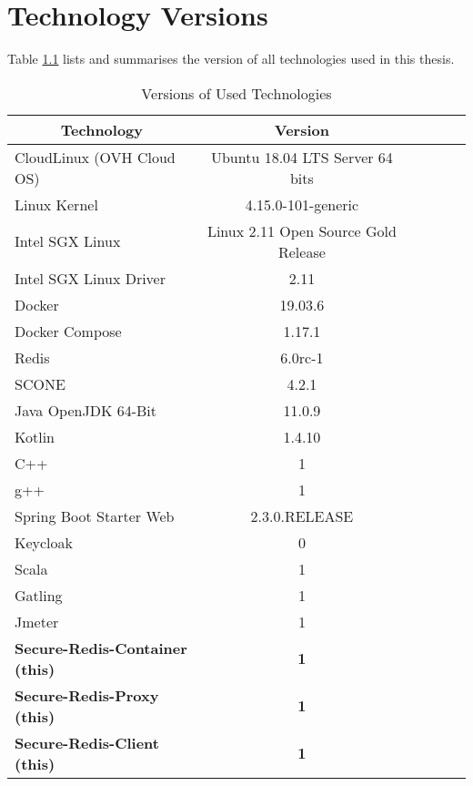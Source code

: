 \chapter{Technology Versions}
\label{ann:technology_versions}

Table \ref{tab:versions_of_used_technologies} lists and summarises the version of all technologies used in this thesis.

\begin{table}[ht]
	\caption{Versions of Used Technologies}
	\label{tab:versions_of_used_technologies}
\centering
\begin{tabular}{lccccc}
	\toprule
	\multicolumn{1}{c}{\textbf{Technology}} 	& \multicolumn{1}{c}{\textbf{Version}} \\
	\midrule
		CloudLinux (OVH Cloud OS) 			& 		Ubuntu 18.04 LTS Server 64 bits 	\\
		Linux Kernel						&		4.15.0-101-generic					\\
		Intel SGX Linux						&		Linux 2.11 Open Source Gold Release \\
		Intel SGX Linux	Driver				&		2.11								\\
		Docker								& 		19.03.6 								\\
		Docker Compose						& 		1.17.1 								\\
		Redis								& 		6.0rc-1 								\\
		SCONE 								& 		4.2.1 								\\
		Java OpenJDK 64-Bit 					& 		11.0.9								\\
		Kotlin 								& 		1.4.10								\\
		C++									& 		1									\\
		g++									& 		1									\\
		Spring Boot Starter	Web				& 		2.3.0.RELEASE						\\
		Keycloak							& 		0									\\
		Scala								& 		1									\\
		Gatling								& 		1									\\
		Jmeter								&		1									\\
	\midrule
	\textbf{Secure-Redis-Container (this)}	&		\textbf{1}							\\
	\textbf{Secure-Redis-Proxy (this)}		&		\textbf{1}							\\
	\textbf{Secure-Redis-Client	(this)}		&		\textbf{1}							\\
	\bottomrule
\end{tabular}
\end{table}


